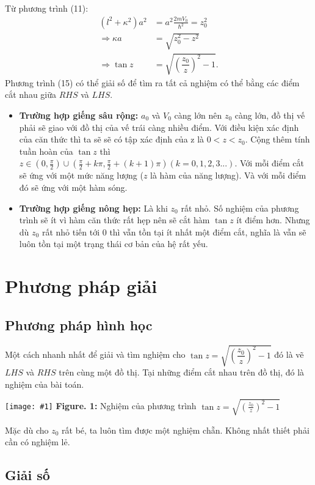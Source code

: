 \documentclass{article}
\newcommand{\image}[3]{
	\begin{center}
		\texttt{[image: \#1]}
		\textbf{Figure. #2:} #3
		\label{fig:#1}
	\end{center}
}
\begin{document}
	Từ phương trình (11):
	\begin{align}
		(l^2 + \kappa^2)a^2 &= a^2\frac{2mV_0}{\hbar^2} = z_0^2 \nonumber\\
		\Rightarrow \kappa a &= \sqrt{z_0^2 - z^2} \\
		\Rightarrow \tan z &= \sqrt{\left( \dfrac{z_0}{z} \right)^2 - 1}.
	\end{align}
	Phương trình (15) có thể giải số để tìm ra tất cả nghiệm có thể bằng các điểm cắt nhau giữa $RHS$ và $LHS$.
	\begin{itemize}
		\item \textbf{Trường hợp giếng sâu rộng:} $a_0$ và $V_0$ càng lớn nên $z_0$ càng lớn, đồ thị vế phải sẽ giao với đồ thị của vế trái càng nhiều điểm. Với điều kiện xác định của căn thức thì ta sẽ sẽ có tập xác định của z là $0 < z < z_0$. Cộng thêm tính tuần hoàn của $\tan{z}$ thì $z \in (0,\frac{\pi}{2}) \cup (\frac{\pi}{2} + k\pi , \frac{\pi}{2} + (k+1)\pi) (k= 0,1,2,3...)$. Với mỗi điểm cắt sẽ ứng với một mức năng lượng ($z$ là hàm của năng lượng). Và với mỗi điểm đó sẽ ứng với một hàm sóng.
		\item \textbf{Trường hợp giếng nông hẹp:} Là khi $z_0$ rất nhỏ. Số nghiệm của phương trình sẽ ít vì hàm căn thức rất hẹp nên sẽ cắt hàm $\tan{z}$ ít điểm hơn. Nhưng dù $z_0$ rất nhỏ tiến tới 0 thì vẫn tồn tại ít nhất một điểm cắt, nghĩa là vẫn sẽ luôn tồn tại một trạng thái cơ bản của hệ rất yếu.
	\end{itemize}
	
	\newpage
	
	\section{Phương pháp giải}
	\subsection{Phương pháp hình học}
	
	Một cách nhanh nhất để giải và tìm nghiệm cho $\tan z = \sqrt{\left( \dfrac{z_0}{z} \right)^2 - 1}$ đó là vẽ $LHS$ và $RHS$ trên cùng một đồ thị. Tại những điểm cắt nhau trên đồ thị, đó là nghiệm của bài toán.
	\image{tan.pdf}{1}{Nghiệm của phương trình $\tan z = \sqrt{\left( \frac{z_0}{z} \right)^2 - 1}$}
	Mặc dù cho $z_0$ rất bé, ta luôn tìm được một nghiệm chẵn. Không nhất thiết phải cần có nghiệm lẻ.
	\subsection{Giải số}
	
\end{document}
